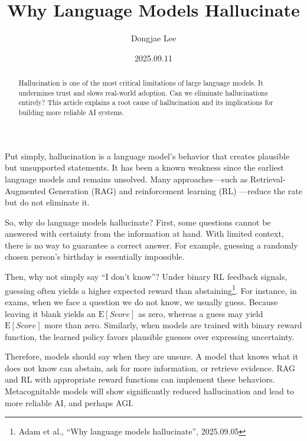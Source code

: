 \documentclass[11pt, oneside]{article}   	%
\title{Why Language Models Hallucinate}
\author{Dongjae Lee}
\date{2025.09.11}
\begin{document}
\maketitle


\begin{abstract}
	Hallucination is one of the most critical limitations of large language models.
	It undermines trust and slows real-world adoption.
	Can we eliminate hallucinations entirely?
	This article explains a root cause of hallucination and its implications for building more reliable AI systems.
\end{abstract}
Put simply, hallucination is a language model's behavior that creates plausible but unsupported statements.
It has been a known weakness since the earliest language models and remains unsolved.
Many approaches—such as Retrieval-Augmented Generation (RAG) and reinforcement learning (RL) —reduce the rate but do not eliminate it.

So, why do language models hallucinate?
First, some questions cannot be answered with certainty from the information at hand.
With limited context, there is no way to guarantee a correct answer.
For example, guessing a randomly chosen person's birthday is essentially impossible.

Then, why not simply say ``I don't know''?
Under binary RL feedback signals, guessing often yields a higher expected reward than abstaining\footnote{Adam et al., ``Why language models hallucinate'', 2025.09.05}.
For instance, in exams, when we face a question we do not know, we usually guess.
Because leaving it blank yields an $\mathrm{E}[Score]$ as zero, whereas a guess may yield $\mathrm{E}[Score]$ more than zero.
Similarly, when models are trained with binary reward function, the learned policy favors plausible guesses over expressing uncertainty.

Therefore, models should say when they are unsure.
A model that knows what it does not know can abstain, ask for more information, or retrieve evidence.
RAG and RL with appropriate reward functions can implement these behaviors.
Metacognitable models will show significantly reduced hallucination and lead to more reliable AI, and perhaps AGI.
\end{document}
